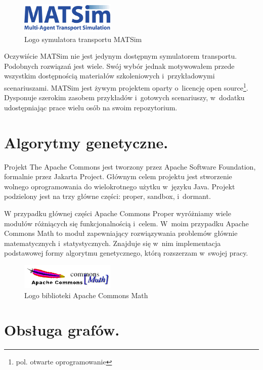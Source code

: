 \documentclass[twoside,12pt]{report}
\begin{document}
\begin{figure}[ht]
\centering
\includegraphics[width=0.40\textwidth]{img/matsim}
\caption{Logo symulatora transportu MATSim} 
\end{figure}

Oczywiście MATSim nie jest jedynym dostępnym symulatorem transportu. Podobnych rozwiązań jest wiele. Swój wybór jednak motywowałem przede wszystkim dostępnością materiałów szkoleniowych i~przykładowymi scenariuszami. MATSim jest żywym projektem oparty o~licencję open source\footnote{pol. otwarte oprogramowanie}. Dysponuje szerokim zasobem przykładów i~gotowych scenariuszy, w~dodatku udostępniając prace wielu osób na swoim repozytorium.

\section{Algorytmy genetyczne.}

Projekt The Apache Commons jest tworzony przez Apache Software Foundation, formalnie przez Jakarta Project. Głównym celem projektu jest stworzenie wolnego oprogramowania do wielokrotnego użytku w~języku Java. Projekt podzielony jest na trzy główne części: proper, sandbox, i~dormant\cite{math}.

W przypadku głównej części Apache Commons Proper wyróżniamy wiele modułów różniących się funkcjonalnością i~celem. W~moim przypadku Apache Commons Math to moduł zapewniający rozwiązywania problemów głównie matematycznych i~statystycznych. Znajduje się w~nim implementacja podstawowej formy algorytmu genetycznego, którą rozszerzam w~swojej pracy.

\begin{figure}[ht]
\centering
\includegraphics[width=0.40\textwidth]{img/math}
\caption{Logo biblioteki Apache Commons Math} 
\end{figure}

\section{Obsługa grafów.}
\end{document}
